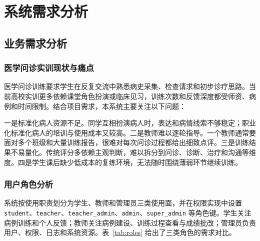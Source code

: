 \chapter{系统需求分析}

\section{业务需求分析}

\subsection{医学问诊实训现状与痛点}

医学问诊训练要求学生在反复交流中熟悉病史采集、检查请求和初步诊疗思路。当前高校实训更多依赖课堂角色扮演或临床见习，训练次数和反馈深度都受师资、病例和时间限制。结合项目需求，本系统主要关注以下问题：

一是标准化病人资源不足。同学互相扮演病人时，表达和病情线索不够稳定；职业化标准化病人的培训与使用成本又较高。二是教师难以逐轮指导。一个教师通常要面对多个班级和大量训练报告，很难对每次问诊过程都给出细致点评。三是训练结果不易量化。传统评分多依赖主观判断，难以拆分到问诊、诊断、治疗和沟通等维度。四是学生课后缺少低成本的复练环境，无法随时围绕薄弱环节继续训练。

\subsection{用户角色分析}

系统按使用职责划分为学生、教师和管理员三类使用面，并在权限实现中设置 \texttt{student}、\texttt{teacher}、\texttt{teacher\_admin}、\texttt{admin}、\texttt{super\_admin} 等角色键。学生关注病例训练和个人反馈；教师关注病例建设、训练过程查看与成绩批改；管理员负责用户、权限、日志和系统资源。表~\ref{tab:roles} 给出了三类角色的需求对比。

